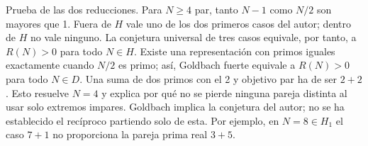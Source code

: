 \documentclass[11pt,a4paper]{article}
\newcommand{\B}[2]{#2}
\newcommand{\B}[2]{#1}
\begin{document}
\B{Proof of the two reductions. For even $N\ge4$, both $N-1$ and $N/2$ are greater than 1. Outside $H$ one of the first two author cases holds; inside $H$ neither holds. Thus the universal three-case conjecture is equivalent to $R(N)>0$ for every $N\in H$. A representation with equal primes exists exactly when $N/2$ is prime; therefore strong Goldbach is equivalent to $R(N)>0$ for every $N\in D$. A sum involving 2 at an even target must be $2+2$. This handles $N=4$ and explains why no distinct pair is lost by using only odd endpoints. Goldbach implies the author’s conjecture; a converse based only on that conjecture is not established. For example at $N=8\in H_1$ the case $7+1$ does not supply the actual prime pair $3+5$.}{Prueba de las dos reducciones. Para $N\ge4$ par, tanto $N-1$ como $N/2$ son mayores que 1. Fuera de $H$ vale uno de los dos primeros casos del autor; dentro de $H$ no vale ninguno. La conjetura universal de tres casos equivale, por tanto, a $R(N)>0$ para todo $N\in H$. Existe una representación con primos iguales exactamente cuando $N/2$ es primo; así, Goldbach fuerte equivale a $R(N)>0$ para todo $N\in D$. Una suma de dos primos con el 2 y objetivo par ha de ser $2+2$. Esto resuelve $N=4$ y explica por qué no se pierde ninguna pareja distinta al usar solo extremos impares. Goldbach implica la conjetura del autor; no se ha establecido el recíproco partiendo solo de esta. Por ejemplo, en $N=8\in H_1$ el caso $7+1$ no proporciona la pareja prima real $3+5$.}
\end{document}
